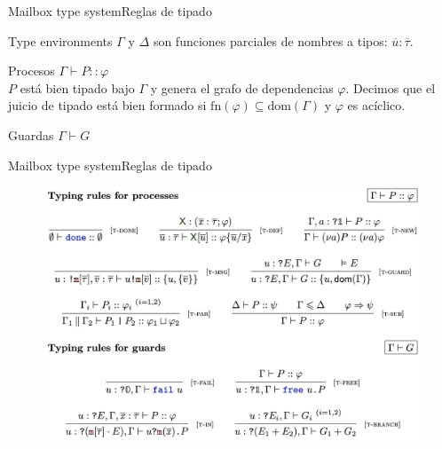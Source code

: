 \documentclass{beamer}
\begin{document}
\begin{frame}{Mailbox type system}{Reglas de tipado}
    \begin{block}{Type environments}
        $\Gamma$ y $\Delta$ son funciones parciales de nombres a tipos: $\overline{u} : \overline{\tau}$.
    \end{block}

    \begin{block}{Procesos}
        $\Gamma \vdash P :: \varphi$
        \\
        $P$ está bien tipado bajo $\Gamma$ y genera el grafo de dependencias $\varphi$. Decimos que el juicio de tipado está bien formado si $\text{fn}(\varphi) \subseteq \text{dom}(\Gamma)$ y $\varphi$ es acíclico.
    \end{block}

    \begin{block}{Guardas}
        $\Gamma \vdash G$
    \end{block}
\end{frame}

\begin{frame}{Mailbox type system}{Reglas de tipado}
    \begin{figure}[H]
        \includegraphics[width=\textwidth]{typing-rules}
    \end{figure}
\end{frame}
\end{document}
